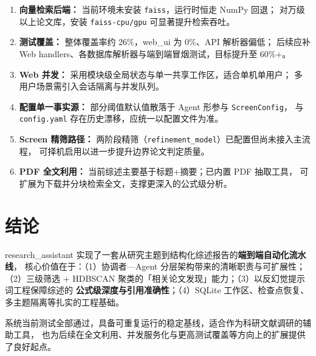 \documentclass[10pt,a4paper]{article}
\begin{document}
\begin{enumerate}[leftmargin=2.2em,itemsep=0.1em]
  \item \textbf{向量检索后端：} 当前环境未安装 \texttt{faiss}，运行时恒走 NumPy 回退；
        对万级以上论文库，安装 \texttt{faiss-cpu/gpu} 可显著提升检索吞吐。
  \item \textbf{测试覆盖：} 整体覆盖率约 26\%，web\_ui 为 0\%、API 解析器偏低；
        后续应补 Web handlers、各数据库解析器与端到端冒烟测试，目标提升至 60\%+。
  \item \textbf{Web 并发：} 采用模块级全局状态与单一共享工作区，适合单机单用户；
        多用户场景需引入会话隔离与并发队列。
  \item \textbf{配置单一事实源：} 部分阈值默认值散落于 Agent 形参与 \texttt{ScreenConfig}，
        与 \texttt{config.yaml} 存在历史漂移，应统一以配置文件为准。
  \item \textbf{Screen 精筛路径：} 两阶段精筛（\texttt{refinement\_model}）已配置但尚未接入主流程，
        可择机启用以进一步提升边界论文判定质量。
  \item \textbf{PDF 全文利用：} 当前综述主要基于标题+摘要；已内置 PDF 抽取工具，
        可扩展为下载并分块检索全文，支撑更深入的公式级分析。
\end{enumerate}

\section{结论}
research\_assistant 实现了一套从研究主题到结构化综述报告的\textbf{端到端自动化流水线}，
核心价值在于：（1）协调者—Agent 分层架构带来的清晰职责与可扩展性；
（2）三级筛选 + HDBSCAN 聚类的「相关论文发现」能力；（3）以反幻觉提示词工程保障综述的
\textbf{公式级深度与引用准确性}；（4）SQLite 工作区、检查点恢复、多主题隔离等扎实的工程基础。

系统当前测试全部通过，具备可重复运行的稳定基线，适合作为科研文献调研的辅助工具，
也为后续在全文利用、并发服务化与更高测试覆盖等方向上的扩展提供了良好起点。

\clearpage

\appendix
\setcounter{page}{1}
\renewcommand{\thepage}{A\arabic{page}}
\fancyhead[R]{\small\color{gray} 附录 \thepage}
\end{document}
